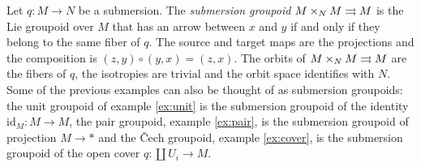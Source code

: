 \begin{example}[submersions]\label{ex:submersion_gpd}
Let $q\colon M\to N$ be a submersion.
The \emph{submersion groupoid} $M\times_N M\rightrightarrows M$ is the Lie groupoid over $M$ that has an arrow between $x$ and $y$ if and only if they belong to the same fiber of $q$.
The source and target maps are the projections and the composition is $(z,y)\circ(y,x)=(z,x)$.
The orbits of $M\times_N M\rightrightarrows M$ are the fibers of $q$, the isotropies are trivial and the orbit space identifies with $N$.
Some of the previous examples can also be thought of as submersion groupoids:
the unit groupoid of example \ref{ex:unit} is the submersion groupoid of the identity $\text{id}_M\colon M\to M$,
the pair groupoid, example \ref{ex:pair}, is the submersion groupoid of projection $M\to *$
and the \v Cech groupoid, example \ref{ex:cover}, is the submersion groupoid of the open cover $q\colon\coprod U_i \to M$.
\end{example}
